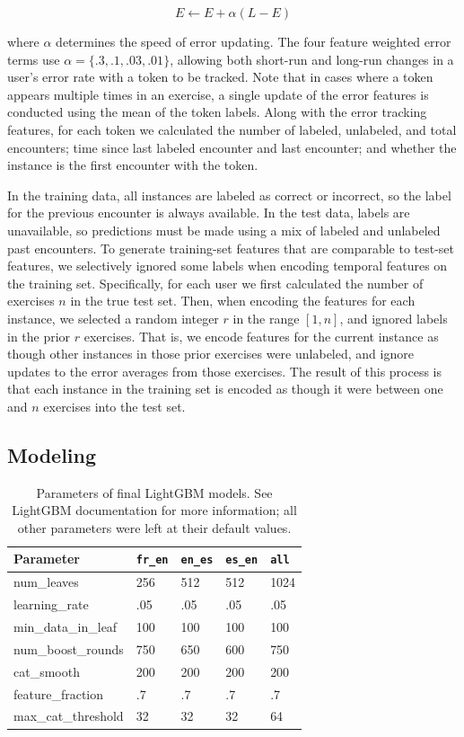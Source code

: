 \documentclass[11pt,a4paper]{article}
\begin{document}
\[
E \leftarrow E + \alpha (L - E)
\]

where $\alpha$ determines the speed of error updating. The four feature weighted
error terms use $\alpha = \{.3, .1, .03, .01\}$, allowing both short-run and
long-run changes in a user's error rate with a token to be tracked. Note that in
cases where a token appears multiple times in an exercise, a single update of
the error features is conducted using the mean of the token labels.
Along with the error tracking features, for each token we calculated the number
of labeled, unlabeled, and total encounters; time since last labeled encounter and
last encounter; and whether the instance is the first encounter with the
token.

In the training data, all instances are labeled as correct or incorrect, so the
label for the previous encounter is always available. In the test data, labels
are unavailable, so predictions must be made using a mix of labeled and
unlabeled past encounters. To generate training-set features that are 
comparable to test-set features, we selectively ignored some labels when encoding temporal features on
the training set. Specifically, for each user we first calculated the number of
exercises $n$ in the true test set. Then, when encoding the features for each
instance, we selected a random integer $r$ in the range $[1,n]$, and ignored labels
in the prior $r$ exercises. That is, we encode features for the current instance
as though other instances in those prior exercises were unlabeled, and ignore
updates to the error averages from those exercises. The result of this process
is that each instance in the training set is encoded as though it were between
one and $n$ exercises into the test set.

\subsection{Modeling}

\begin{table}[t!]
\small
\begin{center}
\begin{tabular}{|l|llll|}
  \hline \bf Parameter & {\tt fr\_en} & {\tt en\_es} & {\tt es\_en} & {\tt all} \\ \hline
  num\_leaves & 256 & 512 & 512 & 1024 \\
  learning\_rate & .05 & .05 & .05 & .05 \\
  min\_data\_in\_leaf & 100 & 100 & 100 & 100 \\
  num\_boost\_rounds & 750 & 650 & 600 & 750 \\
  cat\_smooth & 200 & 200 & 200& 200 \\
  feature\_fraction & .7 & .7 & .7 & .7 \\
  max\_cat\_threshold & 32 & 32 & 32& 64 \\
\hline
\end{tabular}
\end{center}
\caption{\label{lightgbm-params} Parameters of final LightGBM models. See
  LightGBM documentation for more information; all other parameters were left at
their default values.}
\end{table}
\end{document}

